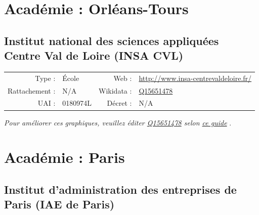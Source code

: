 \documentclass[11pt,french,landscape]{article}
\begin{document}
\newpage

\hypertarget{acaduxe9mie-orluxe9ans-tours-1}{%
\section{Académie :
Orléans-Tours}\label{acaduxe9mie-orluxe9ans-tours-1}}

\hypertarget{institut-national-des-sciences-appliquuxe9es-centre-val-de-loire-insa-cvl}{%
\subsection{Institut national des sciences appliquées Centre Val de
Loire (INSA
CVL)}\label{institut-national-des-sciences-appliquuxe9es-centre-val-de-loire-insa-cvl}}

\begin{tabular*}{0.45\textwidth}{rp{2cm}rl}  
\hline  
Type : & École & Web : &\href{http://www.insa-centrevaldeloire.fr/}{http://www.insa-centrevaldeloire.fr/} \\  
Rattachement : & N/A & Wikidata : & \href{https://www.wikidata.org/entity/Q15651478}{Q15651478} \\  
UAI : & 0180974L & Décret : & N/A \\  
\hline  
\end{tabular*}

\textit{\scriptsize Pour améliorer ces graphiques, veuillez éditer \href{https://www.wikidata.org/entity/Q15651478}{Q15651478}  selon \href{https://github.com/cpesr/wikidataESR/blob/master/Rmd/wikidataESR.md}{ce guide}}
.


\newpage

\hypertarget{acaduxe9mie-paris-2}{%
\section{Académie : Paris}\label{acaduxe9mie-paris-2}}

\hypertarget{institut-dadministration-des-entreprises-de-paris-iae-de-paris}{%
\subsection{Institut d'administration des entreprises de Paris (IAE de
Paris)}\label{institut-dadministration-des-entreprises-de-paris-iae-de-paris}}
\end{document}
